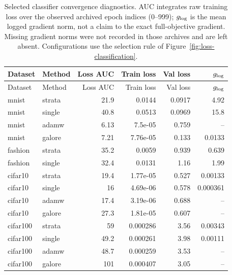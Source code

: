 \begin{longtable}{llrrrr}
\caption{Selected classifier convergence diagnostics. AUC integrates raw training loss over the observed archived epoch indices (0--999); $g_{\rm log}$ is the mean logged gradient norm, not a claim to the exact full-objective gradient. Missing gradient norms were not recorded in those archives and are left absent. Configurations use the selection rule of Figure~\ref{fig:loss-classification}.}\\
\toprule Dataset & Method & Loss AUC & Train loss & Val loss & $g_{\rm log}$\\\midrule\endfirsthead
\toprule Dataset & Method & Loss AUC & Train loss & Val loss & $g_{\rm log}$\\\midrule\endhead
\rowcolor{oursbg}
mnist & strata & 21.9 & 0.0144 & 0.0917 & 4.92 \\
mnist & single & 40.8 & 0.0513 & 0.0969 & 15.8 \\
mnist & adamw & 6.13 & 7.5e-05 & 0.759 & -- \\
mnist & galore & 7.21 & 7.76e-05 & 0.133 & 0.0133 \\
\rowcolor{oursbg}
fashion & strata & 35.2 & 0.0059 & 0.939 & 0.639 \\
fashion & single & 32.4 & 0.0131 & 1.16 & 1.99 \\
\rowcolor{oursbg}
cifar10 & strata & 19.4 & 1.77e-05 & 0.527 & 0.00133 \\
cifar10 & single & 16 & 4.69e-06 & 0.578 & 0.000361 \\
cifar10 & adamw & 17.4 & 3.19e-06 & 0.688 & -- \\
cifar10 & galore & 27.3 & 1.81e-05 & 0.607 & -- \\
\rowcolor{oursbg}
cifar100 & strata & 59 & 0.000286 & 3.56 & 0.00343 \\
cifar100 & single & 49.2 & 0.000261 & 3.98 & 0.00111 \\
cifar100 & adamw & 48.7 & 0.000259 & 3.53 & -- \\
cifar100 & galore & 101 & 0.000407 & 3.05 & -- \\
\bottomrule\end{longtable}
